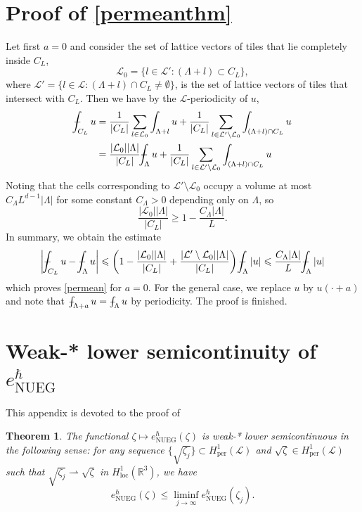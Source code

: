 \documentclass[final,onefignum,onetabnum,reqno]{amsart}
\newtheorem{theorem}{Theorem}[section]
\theoremstyle{remark}
\renewcommand{\le}{\leqslant}
\renewcommand{\ge}{\geqslant}
\newcommand{\RR}{\mathbb{R}}
\newcommand{\per}{\mathrm{per}} %
\newcommand{\NUEG}{\mathrm{NUEG}} %
\newcommand{\wconv}{\rightharpoonup} %
\newcommand{\Hloc}{H_{\mathrm{loc}}} %
\def\Xint#1{\mathchoice
{\XXint\displaystyle\textstyle{#1}}%
{\XXint\textstyle\scriptstyle{#1}}%
{\XXint\scriptstyle\scriptscriptstyle{#1}}%
{\XXint\scriptscriptstyle\scriptscriptstyle{#1}}%
\!\int}
\def\XXint#1#2#3{{\setbox0=\hbox{$#1{#2#3}{\int}$ }
\vcenter{\hbox{$#2#3$ }}\kern-.6\wd0}}
\def\dashint{\Xint-}
\newcommand{\LC}{\mathcal{L}}
\begin{document}
\section{Proof of \cref{permeanthm}}\label{furthersec}
Let first $a=0$ and consider the set of lattice vectors 
of tiles that lie completely inside $C_L$,
$$
\LC_0=\{ l\in\LC' : (\Lambda+l)\subset C_L \},
$$
where $\LC'=\{ l\in\LC : (\Lambda+l)\cap C_L\neq\emptyset\}$,
is the set of lattice vectors of tiles that intersect with $C_L$.
Then we have by the $\LC$-periodicity of $u$,
\begin{align*}
\dashint_{C_L} u&=\frac{1}{|C_L|} \sum_{l\in\LC_0} \int_{\Lambda+l} u + \frac{1}{|C_L|} \sum_{l\in \LC'\setminus\LC_0} \int_{(\Lambda+l)\cap C_L} u\\
&=\frac{|\LC_0||\Lambda|}{|C_L|} \dashint_{\Lambda} u + \frac{1}{|C_L|} \sum_{l\in \LC'\setminus\LC_0} \int_{(\Lambda+l)\cap C_L} u
\end{align*}
Noting that the cells corresponding to $\LC'\setminus\LC_0$ occupy a volume at most $C_\Lambda L^{d-1}|\Lambda|$ for some constant $C_\Lambda>0$ depending only on $\Lambda$, so
$$
\frac{|\LC_0||\Lambda|}{|C_L|}\ge 1 - \frac{C_\Lambda|\Lambda|}{L}.
$$
In summary, we obtain the estimate
\begin{align*}
\left|\dashint_{C_L} u-\dashint_{\Lambda} u\right|\le \left(1-\frac{|\LC_0||\Lambda|}{|C_L|} + \frac{|\LC'\setminus\LC_0||\Lambda|}{|C_L|}\right) \dashint_{\Lambda} |u|\le \frac{C_\Lambda|\Lambda|}{L} \dashint_{\Lambda} |u|
\end{align*}
which proves \cref{permean} for $a=0$. For the general case, we replace $u$ by $u(\cdot+a)$ and note that $\dashint_{\Lambda+a}u=\dashint_{\Lambda} u$ by periodicity. The proof is finished.

\section{Weak-* lower semicontinuity of $e_\NUEG^\hbar$}
This appendix is devoted to the proof of

\begin{theorem}\label{enueglsc}
The functional $\zeta\mapsto e_\NUEG^\hbar(\zeta)$ is weak-* lower semicontinuous in the following sense: for any sequence $\{\sqrt{\zeta_j}\}\subset H_\per^1(\LC)$ and $\sqrt{\zeta}\in H^1_\per(\LC)$ such that $\sqrt{\zeta_j}\wconv\sqrt{\zeta}$ in $\Hloc^1(\RR^3)$, we have
$$
e_\NUEG^\hbar(\zeta)\le \liminf_{j\to\infty} e_\NUEG^\hbar(\zeta_j).
$$
\end{theorem}
\end{document}
